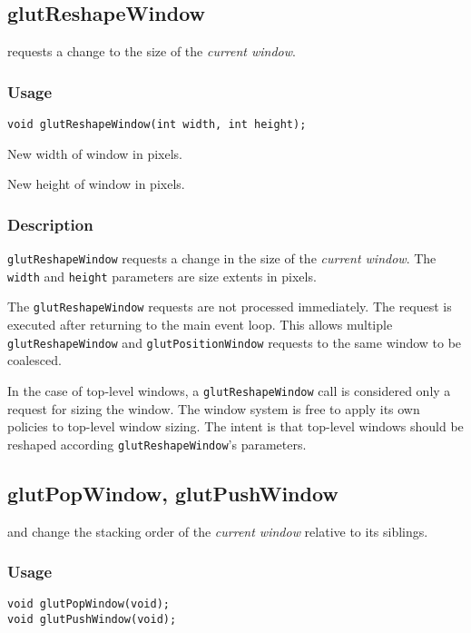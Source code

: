 \subsection{glutReshapeWindow}

 requests a change to the size of
the {\em current window}.

\subsubsection*{Usage}
\begin{verbatim}
void glutReshapeWindow(int width, int height);
\end{verbatim}
\begin{description}
\itemsep 0in
\item[\tt width]
New width of window in pixels.
\item[\tt height]
New height of window in pixels.
\end{description}

\subsubsection*{Description}

{\tt glutReshapeWindow} requests a change in the size of
the {\em current window}.
The {\tt width} and {\tt height} parameters are
size extents in pixels.

The {\tt glutReshapeWindow} requests are not processed immediately.
The request is executed after returning to the main event loop.
This allows multiple {\tt glutReshapeWindow} and {\tt glutPositionWindow}
requests to the same window to be coalesced.

In the case of top-level windows, a {\tt glutReshapeWindow} call
is considered only a request for sizing the window.
The window system is free to apply its own policies to top-level
window sizing.  The intent is that top-level windows
should be reshaped according {\tt glutReshapeWindow}'s parameters.

\subsection{glutPopWindow, glutPushWindow}

 and  change the stacking order
of the {\em current window} relative to its siblings.

\subsubsection*{Usage}
\begin{verbatim}
void glutPopWindow(void);
void glutPushWindow(void);
\end{verbatim}

